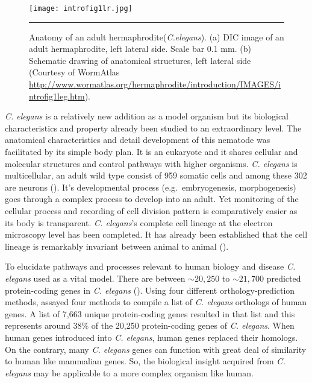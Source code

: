 \begin{figure}%
	\centering
		\texttt{[image: introfig1lr.jpg]}
		\rule{35em}{0.5pt}
	\caption[Anatomy of an adult \textit{C.elegans}]{Anatomy of an adult hermaphrodite(\textit{C.elegans}). 
	(a) DIC image of an adult hermaphrodite, left lateral side. Scale bar 0.1 mm. 
	(b) Schematic drawing of anatomical structures, left lateral side 
	(Courtesy of WormAtlas \url{http://www.wormatlas.org/hermaphrodite/introduction/IMAGES/introfig1leg.htm}).}
	\label{fig:anatomy}
\end{figure}

\textit{C. elegans} is a relatively new addition as a model organism but its biological characteristics and property already been studied to an extraordinary level. The anatomical characteristics and detail development of this nematode was facilitated by its simple body plan. It is an eukaryote and it shares cellular and molecular structures and control pathways with higher organisms. \textit{C. elegans} is multicellular, an adult wild type  consist of 959 somatic cells and among these 302 are neurons (\cite{Sulston:1977, Palikaras:2013}). It's developmental process (e.g.\ embryogenesis, morphogenesis) goes through a complex process to develop into an adult. Yet monitoring of the cellular process  and recording of cell division pattern is comparatively easier as its body is transparent. \textit{C. elegans}'s complete cell lineage at the electron microscopy level has been completed. It has already been established that the cell lineage is remarkably invariant between animal to animal (\cite{Brenner:1974, Byerly:1976, Sulston:1980, Wood:1988}).

To elucidate pathways and processes relevant to human biology and disease \textit{C. elegans} used as a vital model. There are between $\sim20,250$ to $\sim21,700$ predicted protein-coding genes in \textit{C. elegans} (\cite{Gerstein:2010}). Using four different orthology-prediction methods,  \cite{Shaye:2011} assayed four methods to compile a list of \textit{C. elegans} orthologs of human genes. A  list of 7,663 unique protein-coding genes resulted in that list and this represents around 38\% of the 20,250 protein-coding genes of \textit{C. elegans}. When human genes introduced into \textit{C. elegans}, human genes replaced their homologs. On the contrary, many \textit{C. elegans} genes can function with great deal of similarity to human like mammalian genes. So, the biological insight acquired from \textit{C. elegans} may be applicable to a more complex organism like human.

